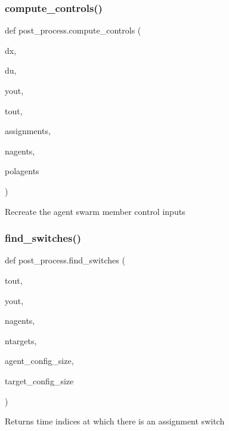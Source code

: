 \subsubsection{\texorpdfstring{compute\_controls()}{compute\_controls()}}
{\footnotesize\ttfamily def post\+\_\+process.\+compute\+\_\+controls (\begin{DoxyParamCaption}\item[{}]{dx,  }\item[{}]{du,  }\item[{}]{yout,  }\item[{}]{tout,  }\item[{}]{assignments,  }\item[{}]{nagents,  }\item[{}]{polagents }\end{DoxyParamCaption})}

\begin{DoxyVerb}Recreate the agent swarm member control inputs\end{DoxyVerb}
 \mbox{\label{namespacepost__process_a1192f5e66dab82fd1c9a577784853d38}} 
\subsubsection{\texorpdfstring{find\_switches()}{find\_switches()}}
{\footnotesize\ttfamily def post\+\_\+process.\+find\+\_\+switches (\begin{DoxyParamCaption}\item[{}]{tout,  }\item[{}]{yout,  }\item[{}]{nagents,  }\item[{}]{ntargets,  }\item[{}]{agent\+\_\+config\+\_\+size,  }\item[{}]{target\+\_\+config\+\_\+size }\end{DoxyParamCaption})}

\begin{DoxyVerb}Returns time indices at which there is an assignment switch\end{DoxyVerb}
 \mbox{\label{namespacepost__process_a390cea7e2e66550ffd937f5e22d641cb}} 
